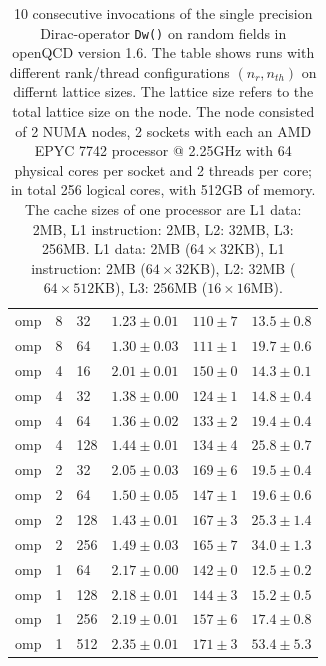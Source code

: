 \documentclass{article}
\theoremstyle{plain} %
\theoremstyle{convention} %
\theoremstyle{remark} %
\def\code#1{\texttt{#1}}
\numberwithin{equation}{section}
\begin{document}
\begin{table}
\begin{tabular}{ |p{1.5cm}||p{1cm}|p{1cm}|p{2cm}|p{2cm}|p{2cm}| }
        omp & 8 & 32 & $1.23 \pm 0.01$ & $110 \pm 7$ & $13.5 \pm 0.8$ \\
        omp & 8 & 64 & $1.30 \pm 0.03$ & $111 \pm 1$ & $19.7 \pm 0.6$ \\
        \hline
        omp & 4 & 16 & $2.01 \pm 0.01$ & $150 \pm 0$ & $14.3 \pm 0.1$ \\
        omp & 4 & 32 & $1.38 \pm 0.00$ & $124 \pm 1$ & $14.8 \pm 0.4$ \\
        omp & 4 & 64 & $1.36 \pm 0.02$ & $133 \pm 2$ & $19.4 \pm 0.4$ \\
        omp & 4 & 128 & $1.44 \pm 0.01$ & $134 \pm 4$ & $25.8 \pm 0.7$ \\
        \hline
        omp & 2 & 32 & $2.05 \pm 0.03$ & $169 \pm 6$ & $19.5 \pm 0.4$ \\
        omp & 2 & 64 & $1.50 \pm 0.05$ & $147 \pm 1$ & $19.6 \pm 0.6$ \\
        omp & 2 & 128 & $1.43 \pm 0.01$ & $167 \pm 3$ & $25.3 \pm 1.4$ \\
        omp & 2 & 256 & $1.49 \pm 0.03$ & $165 \pm 7$ & $34.0 \pm 1.3$ \\
        \hline
        omp & 1 & 64 & $2.17 \pm 0.00$ & $142 \pm 0$ & $12.5 \pm 0.2$ \\
        omp & 1 & 128 & $2.18 \pm 0.01$ & $144 \pm 3$ & $15.2 \pm 0.5$ \\
        omp & 1 & 256 & $2.19 \pm 0.01$ & $157 \pm 6$ & $17.4 \pm 0.8$ \\
        omp & 1 & 512 & $2.35 \pm 0.01$ & $171 \pm 3$ & $53.4 \pm 5.3$ \\
        \hline
    \end{tabular}
    \caption{\num{10} consecutive invocations of the single precision Dirac-operator \code{Dw()} on random fields in openQCD version 1.6. The table shows runs with different rank/thread configurations $(n_r, n_{th})$ on differnt lattice sizes. The lattice size refers to the total lattice size on the node. The node consisted of \num{2} NUMA nodes, \num{2} sockets with each an AMD EPYC 7742 processor @ 2.25GHz with \num{64} physical cores per socket and \num{2} threads per core; in total \num{256} logical cores, with 512GB of memory. The cache sizes of one processor are L1 data: 2MB, L1 instruction: 2MB, L2: 32MB, L3: 256MB. L1 data: 2MB ($64 \times 32$KB), L1 instruction: 2MB ($64 \times 32$KB), L2: 32MB ($64 \times 512$KB), L3: 256MB ($16 \times 16$MB).}
    \label{tab:dop_omp_amd}
\end{table}
\end{document}
